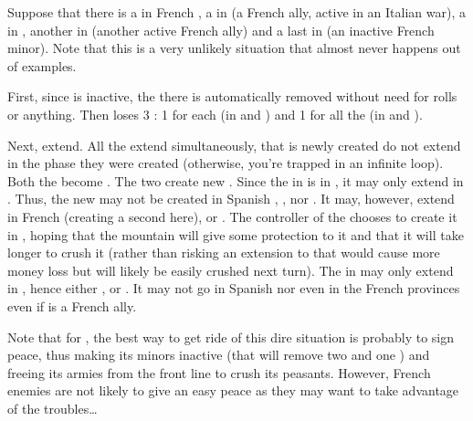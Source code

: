 \begin{exemple}
  Suppose that there is a \REVOLT\Faceplus in French \provinceBearn, a
  \REVOLT\Faceplus in \provinceSavoia (a French ally, active in an Italian
  war), a \REVOLT\Facemoins in \provinceBerry, another in \provincePfalz
  (another active French ally) and a last \REVOLT\Faceplus in
  \provinceLorraine (an inactive French minor). Note that this is a very
  unlikely situation that almost never happens out of examples.

  First, since \paysLorraine is inactive, the \REVOLT there is automatically
  removed without need for rolls or anything. Then \FRA loses 3 \STAB: 1 for
  each \REVOLT\Faceplus (in \provinceBearn and \provinceSavoia) and 1 for all
  the \REVOLT\Facemoins (in \provinceBerry and \provincePfalz).

  Next, \REVOLT extend. All the \REVOLT extend simultaneously, that is newly
  created \REVOLT do not extend in the phase they were created (otherwise,
  you're trapped in an infinite loop). Both the \REVOLT\Facemoins become
  \REVOLT\Faceplus. The two \REVOLT\Faceplus create new
  \REVOLT\Facemoins. Since the \REVOLT\Faceplus in \provinceBearn is in \FRA,
  it may only extend in \FRA. Thus, the new \REVOLT\Facemoins may not be
  created in Spanish \provinceVizcaya, \provinceNavarra, \provincePirineos nor
  \provinceRosselo. It may, however, extend in French \provinceBearn (creating
  a second \REVOLT here), \provinceGuyenne or \provinceLanguedoc. The
  controller of the \REVOLT chooses to create it in \provinceBearn, hoping
  that the mountain will give some protection to it and that it will take
  longer to crush it (rather than risking an extension to \provinceLanguedoc
  that would cause more money loss but will likely be easily crushed next
  turn). The \REVOLT\Faceplus in \provinceSavoia may only extend in
  \paysSavoie, hence either \provinceSavoia, \provinceBresse or
  \provinceNice. It may not go in Spanish \provinceLombardia nor even in the
  French provinces even if \paysSavoie is a French ally.

  \smallskip

  Note that for \FRA, the best way to get ride of this dire situation is
  probably to sign peace, thus making its minors inactive (that will remove
  two \REVOLT\Faceplus and one \REVOLT\Facemoins) and freeing its armies from
  the front line to crush its peasants. However, French enemies are not likely
  to give an easy peace as they may want to take advantage of the
  troubles\ldots
\end{exemple}


